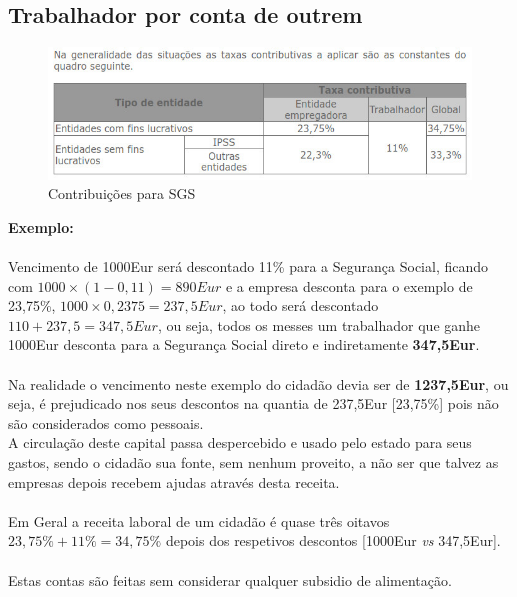 \subsection{Trabalhador por conta de outrem}
\begin{figure}[H]
\flushleft
\includegraphics[scale=.5]{./image/SGS/Contribuicoes_1.jpg}
\caption{Contribuições para SGS}
\end{figure}\par
\textbf{Exemplo:} \\
\\
Vencimento de 1000Eur será descontado 11\% para a Segurança Social, ficando com $1000\times (1-0,11)=890Eur$ e a empresa desconta para o exemplo de 23,75\%, $1000\times 0,2375=237,5Eur$, ao todo será descontado $110+237,5=347,5Eur$, ou seja, todos os messes um trabalhador que ganhe 1000Eur desconta para a Segurança Social direto e indiretamente \textbf{347,5Eur}. \\ \\
Na realidade o vencimento neste exemplo do cidadão devia ser de \textbf{1237,5Eur}, ou seja, é prejudicado nos seus descontos na quantia de 237,5Eur [23,75\%] pois não são considerados como pessoais. \\
A circulação deste capital passa despercebido e usado pelo estado para seus gastos, sendo o cidadão sua fonte, sem nenhum proveito, a não ser que talvez as empresas depois recebem ajudas através desta receita. \\ \\
Em Geral a receita laboral de um cidadão é quase três oitavos $23,75\%+11\%=34,75\%$ depois dos respetivos descontos [1000Eur \textit{vs} 347,5Eur]. \\
\\
Estas contas são feitas sem considerar qualquer subsidio de alimentação. \\
\\
\big[ \; \textcolor{green}{\small link: \quad http://www.seg-social.pt/trabalhadores-por-conta-de-outrem} \; \big]
